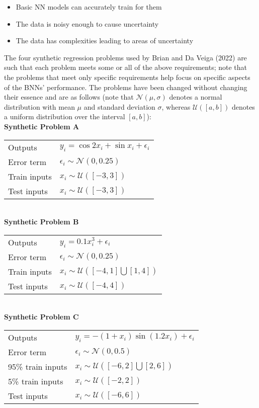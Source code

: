 \documentclass[conference]{IEEEtran}
\begin{document}
\begin{itemize}
    \item Basic NN models can accurately train for them
    \item The data is noisy enough to cause uncertainty
    \item The data has complexities leading to areas of uncertainty\\
\end{itemize}

The four synthetic regression problems used by Brian and Da Veiga (2022) are such that each problem meets some or all of the above requirements; note that the problems that meet only specific requirements help focus on specific aspects of the BNNs' performance. The problems have been changed without changing their essence and are as follows (note that $\mathcal{N}(\mu, \sigma)$ denotes a normal distribution with mean $\mu$ and standard deviation $\sigma$, whereas $\mathcal{U}([a, b])$ denotes a uniform distribution over the interval $[a, b]$):\\

\textbf{Synthetic Problem A}

\begin{tabular}{m{2.5cm} | m{6cm}}
    Outputs & $y_i = \cos{2x_i} + \sin{x_i} + \epsilon_i$ \\
    Error term & $\epsilon_i \sim \mathcal{N}(0, 0.25)$ \\
    Train inputs & $x_i \sim \mathcal{U}([-3, 3])$ \\
    Test inputs & $x_i \sim \mathcal{U}([-3, 3])$
\end{tabular} \\

\textbf{Synthetic Problem B}

\begin{tabular}{m{2.5cm} | m{6cm}}
    Outputs & $y_i = 0.1x_i^3 + \epsilon_i$ \\
    Error term & $\epsilon_i \sim \mathcal{N}(0, 0.25)$ \\
    Train inputs & $x_i \sim \mathcal{U}([-4, 1] \bigcup [1, 4])$ \\
    Test inputs & $x_i \sim \mathcal{U}([-4, 4])$
\end{tabular} \\

\textbf{Synthetic Problem C}

\begin{tabular}{m{2.5cm} | m{6cm}}
    Outputs & $y_i = -(1 + x_i)\sin(1.2x_i) + \epsilon_i$ \\
    Error term & $\epsilon_i \sim \mathcal{N}(0, 0.5)$ \\
    95\% train inputs & $x_i \sim \mathcal{U}([-6, 2] \bigcup [2, 6])$ \\
    5\% train inputs & $x_i \sim \mathcal{U}([-2, 2])$ \\
    Test inputs & $x_i \sim \mathcal{U}([-6, 6])$
\end{tabular} \\
\end{document}
